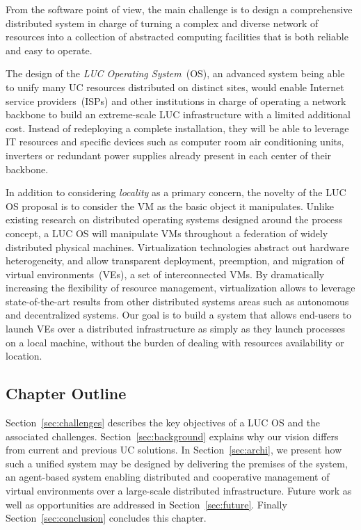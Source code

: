 From the software point of view, the main challenge is to design a comprehensive distributed
system in charge of turning a complex and diverse network of resources into a collection
of abstracted computing facilities that is both reliable and easy to operate.

\begin{svgraybox}
  The design of the \emph{LUC  Operating System}~(OS),  an advanced system being able to unify many UC
  resources distributed on distinct sites,  would enable Internet service providers~(ISPs)
  and other institutions in charge of operating a network backbone to build an
  extreme-scale LUC infrastructure with a limited additional cost. Instead of redeploying
  a complete installation, they will be able to leverage IT resources and specific devices
  such as computer room air conditioning units, inverters or redundant power supplies
  already present in each center of their backbone.
\end{svgraybox}


In addition to considering \emph{locality} as a primary concern, the novelty of the LUC OS
proposal is to consider the VM as the basic object it manipulates.  Unlike existing
research on distributed operating systems designed around the process concept, a LUC OS
will manipulate VMs throughout a federation of widely distributed physical
machines. Virtualization technologies abstract out hardware heterogeneity, and allow
transparent deployment, preemption, and migration of virtual environments~(VEs), \ie a set
of interconnected VMs.  By dramatically increasing the flexibility of resource management,
virtualization allows to leverage state-of-the-art results from other distributed systems
areas such as autonomous and decentralized systems.  Our goal is to build a system that
allows end-users to launch VEs over a distributed infrastructure as simply as they launch
processes on a local machine, \ie without the burden of dealing with resources
availability or location.

\subsection{Chapter Outline} 
Section~\ref{sec:challenges} describes the key objectives of a LUC OS and the associated
challenges.  Section~\ref{sec:background} explains why our vision differs from current and
previous UC solutions. In Section~\ref{sec:archi}, we present how such a unified system
may be designed by delivering the premises of the \discovery system, an agent-based system
enabling distributed and cooperative management of virtual environments over a large-scale
distributed infrastructure.  Future work as well as opportunities are addressed in
Section~\ref{sec:future}. Finally Section~\ref{sec:conclusion} concludes this chapter.

